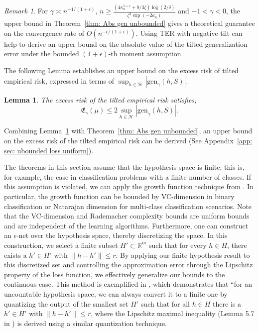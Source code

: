 \documentclass{article}
\theoremstyle{plain}
\theoremstyle{plain}
\newtheorem{lemma}[theorem]{Lemma}
\theoremstyle{definition}
\theoremstyle{remark}
\newtheorem{remark}[theorem]{Remark}
\begin{document}
\begin{remark}\label{rem: unbounded rate}
    For $\gamma \asymp 
    n^{-1/(1+\epsilon)}$, $n\geq \frac{(4\kappa_u^{1+\epsilon}+8/3 \zeta )\log(2/\delta)}{\zeta^2\exp(-2\kappa_u)}$ and $-1<\gamma<0$,
    the upper bound in Theorem~\ref{thm: Abs gen unbounded} gives a theoretical guarantee on the convergence rate of $O(n^{-\epsilon/(1+\epsilon)})$. Using TER with negative tilt can help to derive an upper bound on the absolute value of the tilted generalization error under the bounded $(1+\epsilon)$-th moment assumption. 
\end{remark}


The following Lemma establishes an upper bound on the excess risk of tilted empirical risk, expressed in terms of $\sup_{h\in\mathcal{H}}| \mathrm{gen}_{\gamma}(h,S)|$.
\begin{lemma}\label{lem:excess}
    The excess risk of the tilted empirical risk satisfies,
    \begin{equation}
    \mathfrak{E}_{\gamma}(\mu)\leq 2\sup_{h\in\mathcal{H}}| \mathrm{gen}_{\gamma}(h,S)|.\end{equation}
\end{lemma}
Combining Lemma~\ref{lem:excess} with Theorem~\ref{thm: Abs gen unbounded}, an upper bound on the excess risk of the tilted empirical risk can be derived (See Appendix~\ref{app: sec: ubounded loss uniform}).

The theorems in this section assume that the hypothesis space is finite; this is, for example, the case in classification problems with a finite number of classes. If this assumption is violated, we can apply the growth function technique from \citet{bousquet2003introduction,vapnik1999overview}. In particular, the growth function can be bounded by VC-dimension in binary classification \citep{vapnik1999overview} or Natarajan dimension   \citep{holden1995practical} for multi-class classification scenarios. Note that the VC-dimension and Rademacher complexity bounds are uniform bounds and are independent of the learning algorithms. Furthermore, one can construct an $\epsilon$-net over the hypothesis space, thereby discretizing the space. In this construction, we select a finite subset $ H' \subset \mathbb{R}^m $ such that for every $ h \in H $, there exists a $ h' \in H' $ with $ \|h - h'\| \leq r $. By applying our finite hypothesis result to this discretized set and controlling the approximation error through the Lipschitz property of the loss function, we effectively generalize our bounds to the continuous case. This method is exemplified in \citep{xu2017information}, which demonstrates that “for an uncountable hypothesis space, we can always convert it to a finite one by quantizing the output of the smallest set $ H' $ such that for all $ h \in H $ there is a $ h' \in H' $ with $ \|h - h'\| \leq r $, where the Lipschitz maximal inequality (Lemma 5.7 in \citep{vershynin2010introduction}) is derived using a similar quantization technique.
\end{document}
